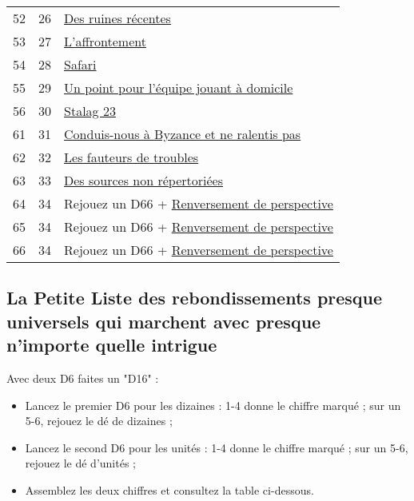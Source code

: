 \begin{center}
\begin{tabular}{ccl}
52 & 26 & \hyperlink{ruines}{Des ruines récentes} \\
53 & 27 & \hyperlink{affrontement}{L’affrontement} \\
54 & 28 & \hyperlink{safari}{Safari} \\
55 & 29 & \hyperlink{domicile}{Un point pour l’équipe jouant à domicile} \\
56 & 30 & \hyperlink{stalag}{Stalag 23} \\
61 & 31 & \hyperlink{byzance}{Conduis-nous à Byzance et ne ralentis pas} \\
62 & 32 & \hyperlink{troubles}{Les fauteurs de troubles} \\
63 & 33 & \hyperlink{sources}{Des sources non répertoriées} \\
64 & 34 & Rejouez un D66 + \hyperlink{renversement}{Renversement de perspective} \\
65 & 34 & Rejouez un D66 + \hyperlink{renversement}{Renversement de perspective} \\
66 & 34 & Rejouez un D66 + \hyperlink{renversement}{Renversement de perspective} \\
\end{tabular}
\end{center}

\newpage

\subsection*{La Petite Liste des rebondissements presque universels qui marchent avec presque n'importe quelle intrigue}
\hypertarget{petiteliste}{}

Avec deux D6 faites un "D16" :
\begin{itemize}
\item Lancez le premier D6 pour les dizaines : 1-4 donne le chiffre marqué ; sur un 5-6, rejouez le dé de dizaines ;
\item Lancez le second D6 pour les unités : 1-4 donne le chiffre marqué ; sur un 5-6, rejouez le dé d'unités ;
\item Assemblez les deux chiffres et consultez la table ci-dessous.
\end{itemize}

\vspace{0.3cm}

